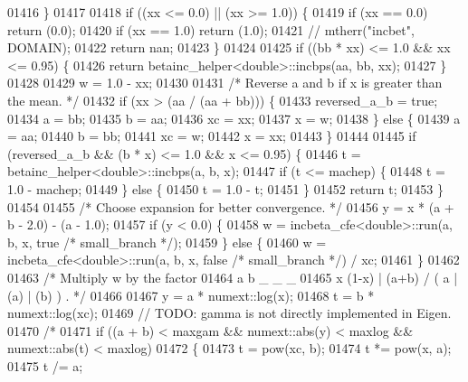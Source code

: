 \begin{DoxyCode}
01416     \}
01417 
01418     \textcolor{keywordflow}{if} ((xx <= 0.0) || (xx >= 1.0)) \{
01419       \textcolor{keywordflow}{if} (xx == 0.0) \textcolor{keywordflow}{return} (0.0);
01420       \textcolor{keywordflow}{if} (xx == 1.0) \textcolor{keywordflow}{return} (1.0);
01421       \textcolor{comment}{// mtherr("incbet", DOMAIN);}
01422       \textcolor{keywordflow}{return} nan;
01423     \}
01424 
01425     \textcolor{keywordflow}{if} ((bb * xx) <= 1.0 && xx <= 0.95) \{
01426       \textcolor{keywordflow}{return} betainc\_helper<double>::incbps(aa, bb, xx);
01427     \}
01428 
01429     w = 1.0 - xx;
01430 
01431     \textcolor{comment}{/* Reverse a and b if x is greater than the mean. */}
01432     \textcolor{keywordflow}{if} (xx > (aa / (aa + bb))) \{
01433       reversed\_a\_b = \textcolor{keyword}{true};
01434       a = bb;
01435       b = aa;
01436       xc = xx;
01437       x = w;
01438     \} \textcolor{keywordflow}{else} \{
01439       a = aa;
01440       b = bb;
01441       xc = w;
01442       x = xx;
01443     \}
01444 
01445     \textcolor{keywordflow}{if} (reversed\_a\_b && (b * x) <= 1.0 && x <= 0.95) \{
01446       t = betainc\_helper<double>::incbps(a, b, x);
01447       \textcolor{keywordflow}{if} (t <= machep) \{
01448         t = 1.0 - machep;
01449       \} \textcolor{keywordflow}{else} \{
01450         t = 1.0 - t;
01451       \}
01452       \textcolor{keywordflow}{return} t;
01453     \}
01454 
01455     \textcolor{comment}{/* Choose expansion for better convergence. */}
01456     y = x * (a + b - 2.0) - (a - 1.0);
01457     \textcolor{keywordflow}{if} (y < 0.0) \{
01458       w = incbeta\_cfe<double>::run(a, b, x, \textcolor{keyword}{true} \textcolor{comment}{/* small\_branch */});
01459     \} \textcolor{keywordflow}{else} \{
01460       w = incbeta\_cfe<double>::run(a, b, x, \textcolor{keyword}{false} \textcolor{comment}{/* small\_branch */}) / xc;
01461     \}
01462 
01463     \textcolor{comment}{/* Multiply w by the factor}
01464 \textcolor{comment}{         a      b   \_             \_     \_}
01465 \textcolor{comment}{        x  (1-x)   | (a+b) / ( a | (a) | (b) ) .   */}
01466 
01467     y = a * numext::log(x);
01468     t = b * numext::log(xc);
01469     \textcolor{comment}{// TODO: gamma is not directly implemented in Eigen.}
01470     \textcolor{comment}{/*}
01471 \textcolor{comment}{    if ((a + b) < maxgam && numext::abs(y) < maxlog && numext::abs(t) < maxlog)}
01472 \textcolor{comment}{    \{}
01473 \textcolor{comment}{      t = pow(xc, b);}
01474 \textcolor{comment}{      t *= pow(x, a);}
01475 \textcolor{comment}{      t /= a;}

\end{DoxyCode}
